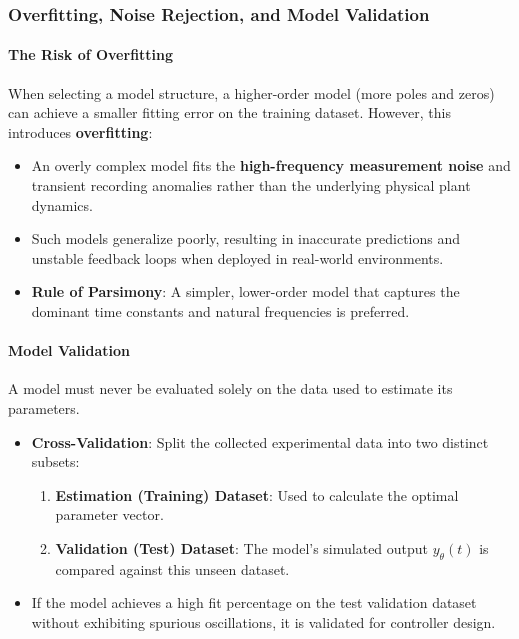 \documentclass[12pt,onecolumn,twoside ]{article}
\begin{document}
	\subsubsection{Overfitting, Noise Rejection, and Model Validation}
	\paragraph{The Risk of Overfitting}
	When selecting a model structure, a higher-order model (more poles and zeros) can achieve a smaller fitting error on the training dataset. However, this introduces \textbf{overfitting}:
	\begin{itemize}
		\item
		An overly complex model fits the \textbf{high-frequency measurement noise} and transient recording anomalies rather than the underlying physical plant dynamics.
		\item
		Such models generalize poorly, resulting in inaccurate predictions and unstable feedback loops when deployed in real-world environments.
		\item
		\textbf{Rule of Parsimony}: A simpler, lower-order model that captures the dominant time constants and natural frequencies is preferred.
	\end{itemize}
	\paragraph{Model Validation}
	A model must never be evaluated solely on the data used to estimate its parameters.
	\begin{itemize}
		\item
		\textbf{Cross-Validation}: Split the collected experimental data into two distinct subsets:
		\begin{enumerate}
			\item
			\textbf{Estimation (Training) Dataset}: Used to calculate the optimal parameter vector.
			\item
			\textbf{Validation (Test) Dataset}: The model’s simulated output $y_\theta(t)$ is compared against this unseen dataset.
		\end{enumerate}
		\item
		If the model achieves a high fit percentage on the test validation dataset without exhibiting spurious oscillations, it is validated for controller design.
	\end{itemize}
	
\end{document}
